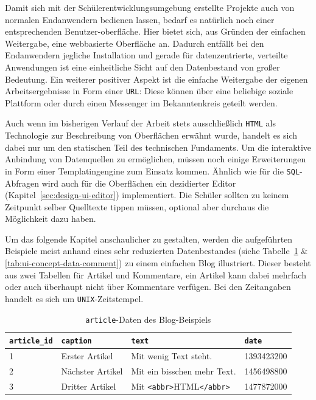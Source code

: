 Damit sich mit der Schülerentwicklungsumgebung erstellte Projekte auch von normalen Endanwendern bedienen lassen, bedarf es natürlich noch einer entsprechenden Benutzer-oberfläche. Hier bietet sich, aus Gründen der einfachen Weitergabe, eine webbasierte Oberfläche an. Dadurch entfällt bei den Endanwendern jegliche Installation und gerade für datenzentrierte, verteilte Anwendungen ist eine einheitliche Sicht auf den Datenbestand von großer Bedeutung. Ein weiterer positiver Aspekt ist die einfache Weitergabe der eigenen Arbeitsergebnisse in Form einer \texttt{URL}: Diese können über eine beliebige soziale Plattform oder durch einen Messenger im Bekanntenkreis geteilt werden.


Auch wenn im bisherigen Verlauf der Arbeit stets ausschließlich \texttt{HTML} als Technologie zur Beschreibung von Oberflächen erwähnt wurde, handelt es sich dabei nur um den statischen Teil des technischen Fundaments. Um die interaktive Anbindung von Datenquellen zu ermöglichen, müssen noch einige Erweiterungen in Form einer Templatingengine zum Einsatz kommen. Ähnlich wie für die \texttt{SQL}-Abfragen wird auch für die Oberflächen ein dezidierter Editor (Kapitel~\ref{sec:design-ui-editor}) implementiert. Die Schüler sollten zu keinem Zeitpunkt selber Quelltexte tippen müssen, optional aber durchaus die Möglichkeit dazu haben.

Um das folgende Kapitel anschaulicher zu gestalten, werden die aufgeführten Beispiele meist anhand eines sehr reduzierten Datenbestandes (siehe Tabelle~\ref{tab:ui-concept-data-article} \& \ref{tab:ui-concept-data-comment}) zu einem einfachen Blog illustriert. Dieser besteht aus zwei Tabellen für Artikel und Kommentare, ein Artikel kann dabei mehrfach oder auch überhaupt nicht über Kommentare verfügen. Bei den Zeitangaben handelt es sich um \texttt{UNIX}-Zeitstempel.

\begin{table}[h]
  \centering
  \begin{tabularx}{\linewidth}{ l l X l }
    \texttt{article\_id}&\texttt{caption}&\texttt{text}&\texttt{date}\\
    \hline
    1&Erster Artikel&Mit wenig Text steht.&1393423200\\
    2&Nächster Artikel&Mit ein bisschen mehr Text.&1456498800\\
    3&Dritter Artikel&Mit \texttt{<abbr>}HTML\texttt{</abbr>}&1477872000\\
  \end{tabularx}
  \caption{\texttt{article}-Daten des Blog-Beispiels}
  \label{tab:ui-concept-data-article}
\end{table}


